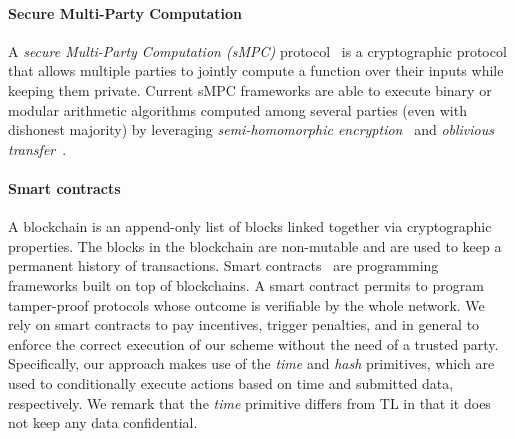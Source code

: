 \paragraph*{Secure Multi-Party Computation}

A {\em secure Multi-Party Computation (\em sMPC)} protocol~\cite{DBLP:journals/corr/abs-1804-03548,yao82} is a cryptographic protocol that allows multiple parties to jointly compute a function over their inputs while keeping them private.
Current sMPC frameworks are able to execute binary or modular arithmetic algorithms computed among several parties (even with dishonest majority) by leveraging {\em semi-homomorphic encryption}~\cite{spdz,keller2018overdrive} and {\em oblivious transfer}~\cite{mascot,rabin2005exchange}.

\smallskip

\paragraph*{Smart contracts}

A blockchain is an append-only list of blocks linked together via cryptographic properties. The blocks in the blockchain are non-mutable and are used to keep a permanent history of transactions.
Smart contracts~\cite{szabo1997formalizing} are programming frameworks built on top of blockchains.
A smart contract permits to program tamper-proof protocols whose outcome is verifiable by the whole network.
%
%
We rely on smart contracts to pay incentives, trigger penalties, and in general to enforce the correct execution of our scheme without the need of a trusted party.
Specifically, our approach makes use of the {\em time} and {\em hash} primitives, which are used to conditionally execute actions based on time and submitted data, respectively.
We remark that the {\em time} primitive differs from TL in that it does not keep any data confidential.

